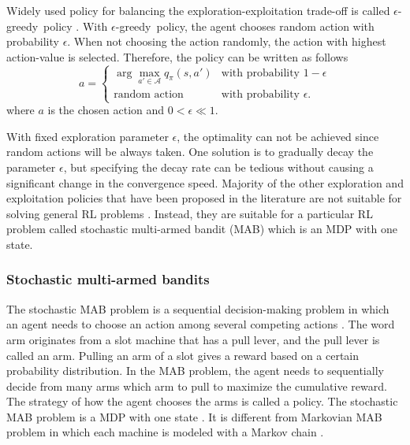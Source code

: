 \documentclass[english, 12pt, a4paper, elec, utf8, a-1b, online]{aaltothesis}
\newcommand{\As}{\mathcal{A}}
\newcommand{\egreedy}{$\epsilon$-greedy~}
\begin{document}
Widely used policy for balancing the exploration-exploitation trade-off is called \egreedy policy \cite{Sutton2018}.
With \egreedy policy, the agent chooses random action with probability $\epsilon$.
When not choosing the action randomly, the action with highest action-value is selected.
Therefore, the policy can be written as follows
\begin{equation}\label{eq:epsilon_greedy}
    a =
    \left\{
        \begin{array}{ll}
            \arg\max_{a' \in \As} q_\pi(s, a') & \text{with probability $1-\epsilon$}\\
            \text{random action} & \text{with probability $\epsilon$}.
        \end{array}
    \right.
\end{equation}
where $a$ is the chosen action and $0 < \epsilon \ll 1$.

With fixed exploration parameter $\epsilon$, the optimality can not be achieved since random actions will be always taken.
One solution is to gradually decay the parameter $\epsilon$, but specifying the decay rate can be tedious without causing a significant change in the convergence speed.
Majority of the other exploration and exploitation policies that have been proposed in the literature are not suitable for solving general RL problems \cite{Slivkins2019}.
Instead, they are suitable for a particular RL problem called stochastic multi-armed bandit (MAB) which is an MDP with one state.

\subsubsection{Stochastic multi-armed bandits}\label{sec:MAB}

The stochastic MAB problem is a sequential decision-making problem in which an agent needs to choose an action among several competing actions \cite{Sutton2018}.
The word arm originates from a slot machine that has a pull lever, and the pull lever is called an arm.
Pulling an arm of a slot gives a reward based on a certain probability distribution.
In the MAB problem, the agent needs to sequentially decide from many arms which arm to pull to maximize the cumulative reward.
The strategy of how the agent chooses the arms is called a policy.
The stochastic MAB problem is a MDP with one state \cite{Sutton2018}.
It is different from Markovian MAB problem in which each machine is modeled with a Markov chain \cite{Katehakis1987}.
\end{document}
